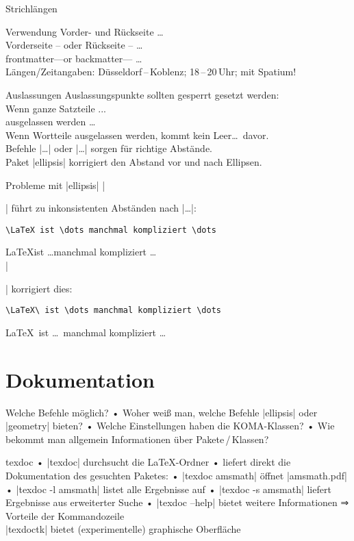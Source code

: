 \begin{frame}[fragile]{Strichlängen}
\begin{block}{Verwendung}
Vorder- und Rückseite \dots\\
Vorderseite – oder Rückseite – \dots\\
frontmatter—or backmatter— \dots\\
Längen/Zeitangaben: Düsseldorf\,–\,Koblenz; 18\,–\,20\,Uhr; mit Spatium!
\end{block}
\end{frame}

\begin{frame}[fragile]{Auslassungen}
Auslassungspunkte sollten gesperrt gesetzt werden:
\\ Wenn ganze Satzteile ...
\\ ausgelassen werden \dots
\\ Wenn Wortteile ausgelassen werden, kommt kein Leer\dots\ davor.
\\[2em]
Befehle |\dots| oder |\ldots| sorgen für richtige Abstände.\\
Paket |ellipsis| korrigiert den Abstand vor und nach Ellipsen.
\end{frame}

\begin{frame}[fragile]{Probleme mit |ellipsis|}
|\usepackage{ellipsis}| führt zu inkonsistenten Abständen nach |\dots|:
\begin{lstlisting}
\LaTeX ist \dots manchmal kompliziert \dots
\end{lstlisting}
\LaTeX ist \dots{}manchmal kompliziert \dots
\\[1em]\pause
|\usepackage[xspace]{ellipsis}| korrigiert dies:
\begin{lstlisting}
\LaTeX\ ist \dots manchmal kompliziert \dots
\end{lstlisting}
\LaTeX\ ist \dots\ manchmal kompliziert \dots
\end{frame}

\section{Dokumentation}
\begin{frame}[fragile]{Welche Befehle möglich?}
• Woher weiß man, welche Befehle |ellipsis| oder |geometry| bieten?
• Welche Einstellungen haben die KOMA-Klassen?
• Wie bekommt man allgemein Informationen über Pakete\,/\,Klassen?
\•
\end{frame}

\begin{frame}[fragile]{texdoc}
• |texdoc| durchsucht die \LaTeX-Ordner
• liefert direkt die Dokumentation des gesuchten Paketes:
• |texdoc amsmath| öffnet |amsmath.pdf|
• |texdoc -l amsmath| listet alle Ergebnisse auf
• |texdoc -s amsmath| liefert Ergebnisse aus erweiterter Suche
• |texdoc --help| bietet weitere Informationen%
\•
⇒ Vorteile der Kommandozeile\\[2em]
|texdoctk| bietet (experimentelle) graphische Oberfläche
\end{frame}

